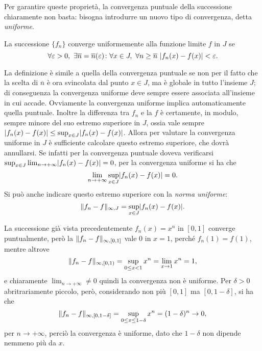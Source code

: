 Per garantire queste proprietà, la convergenza puntuale della successione chiaramente non basta: bisogna introdurre un nuovo tipo di convergenza, detta \emph{uniforme}.
\begin{definizione} \label{d:conv_uniforme_succ}
La successione $\{f_n\}$ converge uniformemente alla funzione limite $f$ in $J$ se
\begin{equation} \label{eq:conv_uniforme_succ}
\forall\epsilon>0,\ \exists\overline{n}=\overline{n}(\epsilon)\colon\forall x\in J,\ \forall n\geq\overline{n}\ \abs{f_n(x)-f(x)}<\epsilon.
\end{equation}
\end{definizione}
La definizione è simile a quella della convergenza puntuale se non per il fatto che la scelta di $\overline{n}$ è ora svincolata dal punto $x\in J$, ma è globale in tutto l'insieme $J$; di conseguenza la convergenza uniforme deve sempre essere associata all'insieme in cui accade. Ovviamente la convergenza uniforme implica automaticamente quella puntuale.
Inoltre la differenza tra $f_n$ e la $f$ è certamente, in modulo, sempre minore del suo estremo superiore in $J$, ossia vale sempre $\lvert f_n(x)-f(x)\rvert\leq\sup_{x\in J}\lvert f_n(x)-f(x)\rvert$. Allora per valutare la convergenza uniforme in $J$ è sufficiente calcolare questo estremo superiore, che dovrà annullarsi. Se infatti per la convergenza puntuale doveva verificarsi $\sup_{x\in J}\lim_{n\to+\infty}\lvert f_n(x)-f(x)\rvert=0$, per la convergenza uniforme si ha che
\begin{equation}
\lim_{n\to+\infty}\sup_{x\in J}\lvert f_n(x)-f(x)\rvert=0.
\end{equation}
Si può anche indicare questo estremo superiore con la \emph{norma uniforme}:
\[
\lVert f_n-f\rVert_{\infty,J}=\sup_{x\in J}\lvert f_n(x)-f(x)\rvert.
\]
\begin{esempio} \label{es:convergenza-uniforme-successioni-1}
	La successione già vista precedentemente $f_n(x)=x^n$ in $[0,1]$ converge puntualmente, però la $\lVert f_n-f\rVert_{\infty,[0,1]}$ vale 0 in $x=1$, perché $f_n(1)=f(1)$, mentre altrove
	\[
	\lVert f_n-f\rVert_{\infty,[0,1)}=\sup_{0\leq x<1} x^n=\lim_{x\to 1}x^n=1,
	\]
	e chiaramente $\lim_{n\to+\infty}\neq 0$ quindi la convergenza non è uniforme. Per $\delta>0$ abritrariamente piccolo, però, considerando non più $[0,1]$ ma $[0,1-\delta]$, si ha che 
	\[
	\lVert f_n-f\rVert_{\infty,[0,1-\delta]}=\sup_{0\leq x\leq 1-\delta} x^n=(1-\delta)^n\to 0,
	\]
	per $n\to+\infty$, perciò la convergenza è uniforme, dato che $1-\delta$ non dipende nemmeno più da $x$.
\end{esempio}
